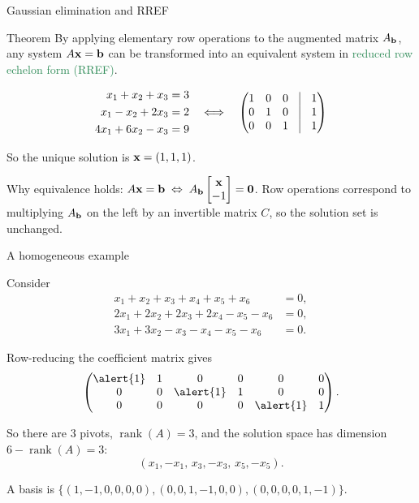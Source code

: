 \documentclass{beamer}
\DeclareMathOperator{\rank}{rank}
\begin{document}
\begin{frame}{Gaussian elimination and RREF}

\begin{alertblock}{Theorem}
By applying elementary row operations to the augmented matrix $A_{\bf b}$, any system $A{\bf x}={\bf b}$ can be transformed into an equivalent system in \textcolor{SeaGreen}{reduced row echelon form (RREF)}.  
\end{alertblock}

\[
\begin{aligned}
x_1+x_2+x_3&=3\\
x_1-x_2+2x_3&=2\\
4x_1+6x_2-x_3&=9
\end{aligned}
\quad\Longleftrightarrow\quad
\begin{pmatrix}
1 & 0 & 0 & \vline & 1 \\
0 & 1 & 0 & \vline & 1 \\
0 & 0 & 1 & \vline & 1
\end{pmatrix}
\]

\smallskip
So the unique solution is ${\bf x}=(1,1,1)$.

\bigskip
\begin{block}{Why equivalence holds:  }
	$A{\bf x}={\bf b}\;\Leftrightarrow\; A_{\bf b}\begin{bmatrix}{\bf x}\\-1\end{bmatrix}={\bf 0}$.  
Row operations correspond to multiplying $A_{\bf b}$ on the left by an invertible matrix $C$, so the solution set is unchanged.
\end{block}
\end{frame}



\begin{frame}{A homogeneous example}

Consider
\[
\begin{aligned}
x_1+x_2+x_3+x_4+x_5+x_6&=0,\\
2x_1+2x_2+2x_3+2x_4-x_5-x_6&=0,\\
3x_1+3x_2-x_3-x_4-x_5-x_6&=0.
\end{aligned}
\]

Row-reducing the coefficient matrix gives
\[
\begin{pmatrix}
\alert{1}&1&0&0&0&0\\
0&0&\alert{1}&1&0&0\\
0&0&0&0&\alert{1}&1
\end{pmatrix}.
\]

So there are $3$ pivots, $\rank(A)=3$, and the solution space has dimension $6-\rank(A)=3$:
\[
(x_1,-x_1,\,x_3,-x_3,\,x_5,-x_5).
\]

{\tiny A basis is $\{(1,-1,0,0,0,0),(0,0,1,-1,0,0),(0,0,0,0,1,-1)\}$.}
\end{frame}
\end{document}
